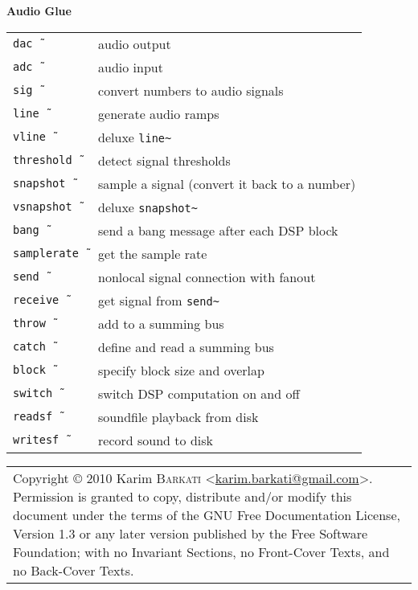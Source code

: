 \documentclass[a4paper, landscape, 10pt]{article}
\newcommand{\email}[1]{\href{mailto:#1}{\textsf{#1}}}
\newcommand{\refcardtitle}[1]{
  \begin{center}
    \textbf{\small{#1}}
  \end{center}
}
\begin{document}
\begin{multicols}{3}
  \refcardtitle{Audio Glue}
  \begin{tabularx}{9cm}{>{\tt}l X}
    dac\~\ & audio output \\
    adc\~\ & audio input \\ 
    sig\~\ & convert numbers to audio signals \\ 
    line\~\ & generate audio ramps \\ 
    vline\~\ & deluxe \texttt{line\~} \\ 
    threshold\~\ & detect signal thresholds \\
    snapshot\~\ & sample a signal (convert it back to a number) \\
    vsnapshot\~\ & deluxe \texttt{snapshot\~} \\
    bang\~\ & send a bang message after each DSP block \\
    samplerate\~\ & get the sample rate \\
    send\~\ & nonlocal signal connection with fanout \\
    receive\~\ & get signal from \texttt{send\~} \\
    throw\~\ & add to a summing bus \\
    catch\~\ & define and read a summing bus \\
    block\~\ & specify block size and overlap \\
    switch\~\ & switch DSP computation on and off \\
    readsf\~\ & soundfile playback from disk \\
    writesf\~\ & record sound to disk \\
  \end{tabularx}

  \medskip{} 
  \noindent{}
  \begin{tabularx}{9cm}{X}
    \tiny{Copyright \copyright{ 2010} Karim \textsc{Barkati} <\email{karim.barkati@gmail.com}>. Permission is granted to copy, distribute and/or modify this document under the terms of the GNU Free Documentation License, Version 1.3 or any later version published by the Free Software Foundation; with no Invariant Sections, no Front-Cover Texts, and no Back-Cover Texts.}
  \end{tabularx}


\end{multicols}
\end{document}
